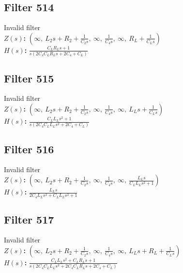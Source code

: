 \documentclass{article}
\begin{document}
\subsection*{Filter 514}
Invalid filter \\ 
\textbf{$Z(s)$:} $\left( \infty, \  L_{2} s + R_{2} + \frac{1}{C_{2} s}, \  \infty, \  \frac{1}{C_{4} s}, \  \infty, \  R_{L} + \frac{1}{C_{L} s}\right)$ \\ 
\textbf{$H(s)$:} $\frac{C_{L} R_{L} s + 1}{s \left(2 C_{4} C_{L} R_{L} s + 2 C_{4} + C_{L}\right)}$ \\ 
\subsection*{Filter 515}
Invalid filter \\ 
\textbf{$Z(s)$:} $\left( \infty, \  L_{2} s + R_{2} + \frac{1}{C_{2} s}, \  \infty, \  \frac{1}{C_{4} s}, \  \infty, \  L_{L} s + \frac{1}{C_{L} s}\right)$ \\ 
\textbf{$H(s)$:} $\frac{C_{L} L_{L} s^{2} + 1}{s \left(2 C_{4} C_{L} L_{L} s^{2} + 2 C_{4} + C_{L}\right)}$ \\ 
\subsection*{Filter 516}
Invalid filter \\ 
\textbf{$Z(s)$:} $\left( \infty, \  L_{2} s + R_{2} + \frac{1}{C_{2} s}, \  \infty, \  \frac{1}{C_{4} s}, \  \infty, \  \frac{L_{L} s}{C_{L} L_{L} s^{2} + 1}\right)$ \\ 
\textbf{$H(s)$:} $\frac{L_{L} s}{2 C_{4} L_{L} s^{2} + C_{L} L_{L} s^{2} + 1}$ \\ 
\subsection*{Filter 517}
Invalid filter \\ 
\textbf{$Z(s)$:} $\left( \infty, \  L_{2} s + R_{2} + \frac{1}{C_{2} s}, \  \infty, \  \frac{1}{C_{4} s}, \  \infty, \  L_{L} s + R_{L} + \frac{1}{C_{L} s}\right)$ \\ 
\textbf{$H(s)$:} $\frac{C_{L} L_{L} s^{2} + C_{L} R_{L} s + 1}{s \left(2 C_{4} C_{L} L_{L} s^{2} + 2 C_{4} C_{L} R_{L} s + 2 C_{4} + C_{L}\right)}$ \\ 
\end{document}

